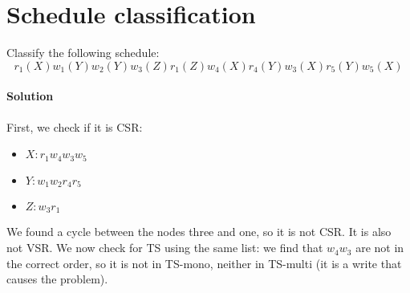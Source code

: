 \section{Schedule classification}

Classify the following schedule:
\[r_1(X) w_1(Y) w_2(Y) w_3(Z) r_1(Z) w_4(X) r_4(Y) w_3(X) r_5(Y) w_5(X)\] 

\paragraph*{Solution}
First, we check if it is CSR:
\begin{itemize}
    \item $X: r_1 w_4 w_3 w_5$
    \item $Y: w_1 w_2 r_4 r_5$
    \item $Z: w_3 r_1$
\end{itemize}
We found a cycle between the nodes three and one, so it is not CSR. It is also not VSR. We now check for TS using the same list: we find that $w_4 w_3$ are not in the correct order, so it is not in TS-mono, neither in TS-multi (it is a write that causes the problem).